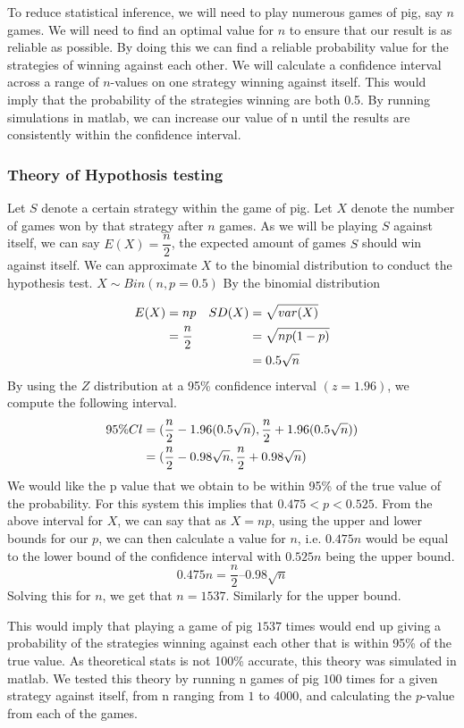 \documentclass[a4paper,titlepage]{article}
\begin{document}
To reduce statistical inference, we will need to play numerous games of pig, say $n$ games. We will need to find an optimal value for $n$ to ensure that our result is as reliable as possible. By doing this we can find a reliable probability value for the strategies of winning against each other. We will calculate a confidence interval across a range of $n$-values on one strategy winning against itself. This would imply that the probability of the strategies winning are both 0.5. By running simulations in matlab, we can increase our value of n until the results are consistently within the confidence interval.
\subsubsection{Theory of Hypothosis testing}
Let $S$ denote a certain strategy within the game of pig.
Let $X$ denote the number of games won by that strategy after $n$ games.
As we will be playing $S$ against itself, we can say $E(X) =
\dfrac{n}{2}$, the expected amount of games $S$ should win against itself.
We can approximate $X$ to the binomial distribution to conduct the hypothesis test.
$X \sim Bin(n , p=0.5)$
By the binomial distribution

\begin{align*}
E(X) &= np & SD(X) &= \sqrt{var(X)}\notag\\
&= \dfrac{n}{2} & &= \sqrt{np(1-p)}\notag\\
& & &= 0.5\sqrt{n} \notag
\end{align*}
By using the $Z$ distribution at a 95\% confidence interval $(z=1.96)$, we compute the following interval.
\begin{align*}
95\%Cl &= (\dfrac{n}{2} -1.96(0.5\sqrt{n}), \dfrac{n}{2} +1.96(0.5\sqrt{n}))\notag\\
&= (\dfrac{n}{2}-0.98\sqrt{n}, \dfrac{n}{2}+0.98\sqrt{n})
\notag
\end{align*}
We would like the p value that we obtain to be within 95\% of the true value of the probability. For this system this implies that $0.475<p<0.525$. From the above interval for $X$, we can say that as $X=np$, using the upper and lower bounds for our $p$, we can then calculate a value for $n$, i.e. $0.475n$ would be equal to the lower bound of the confidence interval with $0.525n$ being the upper bound.
$$0.475n = \dfrac{n}{2} –0.98\sqrt{n}$$
Solving this for $n$, we get that $n=1537$. Similarly for the upper bound.

This would imply that playing a game of pig $1537$ times would end up giving a probability of the strategies winning against each other that is within 95\% of the true value. As theoretical stats is not 100\% accurate, this theory was simulated in matlab. We tested this theory by running n games of pig $100$ times for a given strategy against itself, from n ranging from $1$ to $4000$, and calculating the $p$-value from each of the games.
\end{document}
